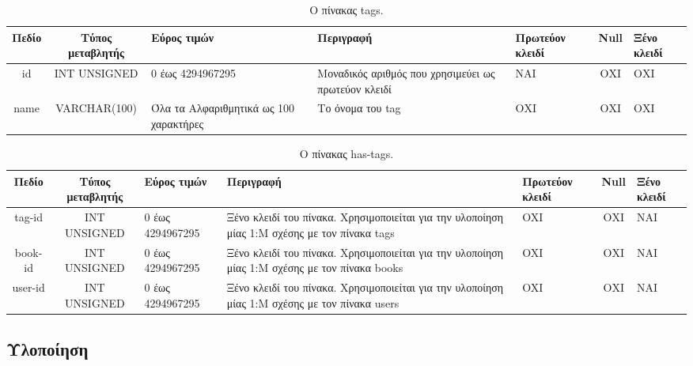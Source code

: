 \documentclass{assignment}
\begin{document}
\begin{landscape}
\begin{table}[htbp]
\begin{center}
  \begin{tabular}{|c|c|m{}|m{}|m{2.0cm}|c|m{1.5cm}|}
    \hline
    {\bf Πεδίο} & {\bf Τύπος μεταβλητής} & {\bf Εύρος τιμών} & {\bf Περιγραφή} & {\bf Πρωτεύον κλειδί} & {\bf Null} & {\bf Ξένο κλειδί} \\ \hline
    id & INT UNSIGNED & 0 έως 4294967295 & Μοναδικός αριθμός που χρησιμεύει ως πρωτεύον κλειδί & ΝΑΙ & ΟΧΙ & ΟΧΙ \\ \hline
    name & VARCHAR(100) & Όλα τα Αλφαριθμητικά ως 100 χαρακτήρες & Το όνομα του tag & ΟΧΙ & ΟΧΙ & ΟΧΙ \\ \hline
  \end{tabular}
\caption{Ο πίνακας tags.}
\label{table:db_table:tags}
\end{center}
\end{table}
\end{landscape}

\begin{landscape}
\begin{table}[htbp]
\begin{center}
  \begin{tabular}{|c|c|m{}|m{}|m{2.0cm}|c|m{1.5cm}|}
    \hline
    {\bf Πεδίο} & {\bf Τύπος μεταβλητής} & {\bf Εύρος τιμών} & {\bf Περιγραφή} & {\bf Πρωτεύον κλειδί} & {\bf Null} & {\bf Ξένο κλειδί} \\ \hline
    tag-id & INT UNSIGNED & 0 έως 4294967295 & Ξένο κλειδί του πίνακα. Χρησιμοποιείται για την υλοποίηση μίας 1:Μ σχέσης με τον πίνακα tags & OXI & ΟΧΙ & NAI \\ \hline
    book-id & INT UNSIGNED & 0 έως 4294967295 & Ξένο κλειδί του πίνακα. Χρησιμοποιείται για την υλοποίηση μίας 1:Μ σχέσης με τον πίνακα books & OXI & ΟΧΙ & NAI \\ \hline
    user-id & INT UNSIGNED & 0 έως 4294967295 & Ξένο κλειδί του πίνακα. Χρησιμοποιείται για την υλοποίηση μίας 1:Μ σχέσης με τον πίνακα users & OXI & ΟΧΙ & NAI \\ \hline
  \end{tabular}
\caption{Ο πίνακας has-tags.}
\label{table:db_table:has-tags}
\end{center}
\end{table}
\end{landscape}

\subsection{Υλοποίηση}
\end{document}
